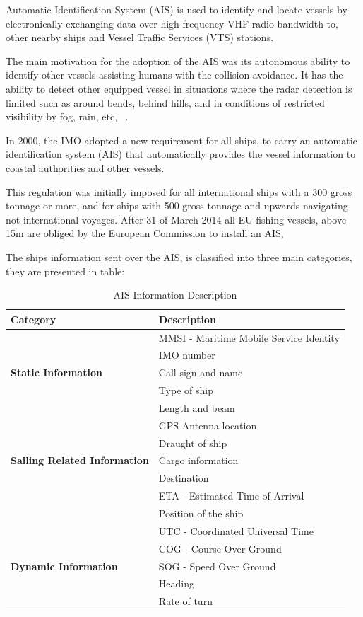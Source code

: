 Automatic Identification System (AIS) is used to identify and locate vessels by electronically exchanging data over high frequency VHF radio bandwidth to, other nearby ships and Vessel Traffic Services (VTS) stations.

The main motivation for the adoption of the AIS was its autonomous ability to identify other vessels assisting humans with the collision avoidance. It has the ability to detect other equipped vessel in situations where the radar detection is limited such as around bends, behind hills, and in conditions of restricted visibility by fog, rain, etc, ~\cite{Harati-Mokhtari2007}. 

In 2000, the IMO adopted a new requirement for all ships, to carry an automatic identification system (AIS) that automatically provides the vessel information to coastal authorities and other vessels.

This regulation was initially imposed for all international ships with a 300 gross tonnage or more, and for ships with 500 gross tonnage and upwards navigating not international voyages. After 31 of March 2014 all EU fishing vessels, above 15m are obliged by the European Commission to install an AIS, ~\cite{EC2018}

The ships information sent over the AIS, is classified into three main categories, they are presented in table:
\begin{table}[H]
\centering
\caption{AIS Information Description}
\label{Table: AIS Categories}
\begin{tabular}{|l|l|}
\hline
\textbf{Category} & \textbf{Description} \\ \hline
 & MMSI - Maritime Mobile Service Identity \\ \cline{2-2} 
 & IMO number \\ \cline{2-2} 
\textbf{Static Information} & Call sign and name \\ \cline{2-2} 
 & Type of ship \\ \cline{2-2} 
 & Length and beam \\ \cline{2-2} 
 & GPS Antenna location \\ \hline
 & Draught of ship \\ \cline{2-2} 
\textbf{Sailing Related Information} & Cargo information \\ \cline{2-2} 
 & Destination \\ \cline{2-2} 
 & ETA - Estimated Time of Arrival \\ \hline
 & Position of the ship \\ \cline{2-2} 
 & UTC - Coordinated Universal Time \\ \cline{2-2} 
 & COG - Course Over Ground \\ \cline{2-2} 
\textbf{Dynamic Information} & SOG - Speed Over Ground \\ \cline{2-2} 
 & Heading \\ \cline{2-2} 
 & Rate of turn \\ \hline
\end{tabular}
\end{table}

